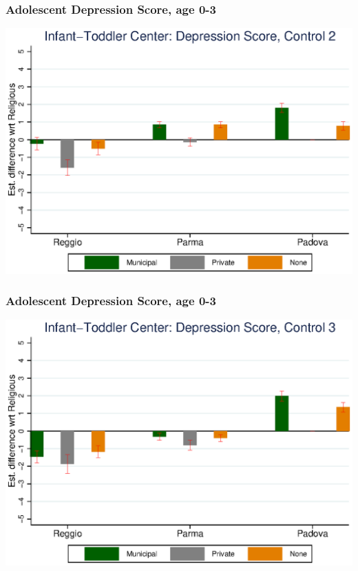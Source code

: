 \documentclass{beamer}
\begin{document}
\begin{frame}\frametitle{Adolescent Depression Score, age 0-3}
\center
\includegraphics[scale=0.7]{../Output/graphs/D_Asilo_Adol_inter.eps}
\end{frame}

\begin{frame}\frametitle{Adolescent Depression Score, age 0-3}
\center
\includegraphics[scale=0.7]{../Output/graphs/D_Asilo_Adol_right.eps}
\end{frame}
\end{document}
